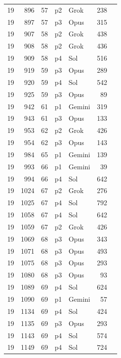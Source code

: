 \begin{longtable}{r r r l l r L{2.3in}}
19 & 896 & 57 & p2 & Grok & 238 &  \\
19 & 897 & 57 & p3 & Opus & 315 &  \\
19 & 907 & 58 & p2 & Grok & 438 &  \\
19 & 908 & 58 & p2 & Grok & 436 &  \\
19 & 909 & 58 & p4 & Sol & 516 &  \\
19 & 919 & 59 & p3 & Opus & 289 &  \\
19 & 920 & 59 & p4 & Sol & 542 &  \\
19 & 925 & 59 & p3 & Opus & 89 &  \\
19 & 942 & 61 & p1 & Gemini & 319 &  \\
19 & 943 & 61 & p3 & Opus & 133 &  \\
19 & 953 & 62 & p2 & Grok & 426 &  \\
19 & 954 & 62 & p3 & Opus & 143 &  \\
19 & 984 & 65 & p1 & Gemini & 139 &  \\
19 & 993 & 66 & p1 & Gemini & 39 &  \\
19 & 994 & 66 & p4 & Sol & 642 &  \\
19 & 1024 & 67 & p2 & Grok & 276 &  \\
19 & 1025 & 67 & p4 & Sol & 792 &  \\
19 & 1058 & 67 & p4 & Sol & 642 &  \\
19 & 1059 & 67 & p2 & Grok & 426 &  \\
19 & 1069 & 68 & p3 & Opus & 343 &  \\
19 & 1071 & 68 & p3 & Opus & 493 &  \\
19 & 1075 & 68 & p3 & Opus & 293 &  \\
19 & 1080 & 68 & p3 & Opus & 93 &  \\
19 & 1089 & 69 & p4 & Sol & 624 &  \\
19 & 1090 & 69 & p1 & Gemini & 57 &  \\
19 & 1134 & 69 & p4 & Sol & 424 &  \\
19 & 1135 & 69 & p3 & Opus & 293 &  \\
19 & 1143 & 69 & p4 & Sol & 574 &  \\
19 & 1149 & 69 & p4 & Sol & 724 &  \\

\end{longtable}
